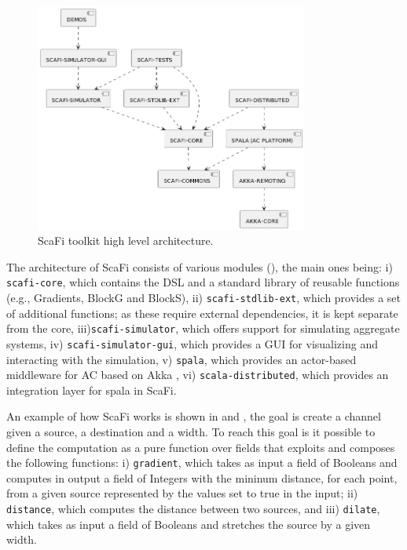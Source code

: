 \documentclass[12pt,a4paper,openright,twoside]{book}
\begin{document}
\begin{figure}[t]
    \centering
    \includegraphics[width=0.8\textwidth]{figures/scafi-arc.png}
    \caption{ScaFi toolkit high level architecture.}
    \label{fig:scafi-arc}
\end{figure}

The architecture of ScaFi consists of various modules (), the main ones being:
    i) \texttt{scafi-core}, which contains the DSL and a standard library of reusable functions 
        (e.g., Gradients, BlockG and BlockS),
    ii) \texttt{scafi-stdlib-ext}, which provides a set of additional functions; as these require external dependencies, 
        it is kept separate from the core,
    iii)\texttt{scafi-simulator}, which offers support for simulating aggregate systems,
    iv) \texttt{scafi-simulator-gui}, which provides a GUI for visualizing and interacting with the simulation,
    v) \texttt{spala}, which provides an actor-based middleware for AC based on Akka \cite{hunt2014introduction},
    vi) \texttt{scala-distributed}, which provides an integration layer for spala in ScaFi.

An example of how ScaFi works is shown in  and , the goal is create a channel given 
    a source, a destination and a width. To reach this goal is it possible to define the computation as a pure function 
    over fields that exploits and composes the following functions:
    i) \texttt{gradient}, which takes as input a field of Booleans and computes in output a field of Integers with the 
        mininum distance, for each point, from a given source represented by the values set to true in the input;
    ii) \texttt{distance}, which computes the distance between two sources, and
    iii) \texttt{dilate}, which takes as input a field of Booleans and stretches the source by a given width.
\end{document}
